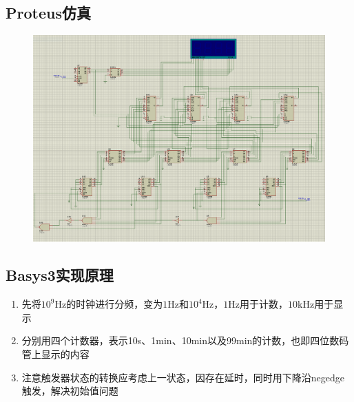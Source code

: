 \documentclass[11pt,UTF8]{ctexart}
\begin{document}
\subsection{Proteus仿真}
\begin{figure}[H]
    \centering
    \includegraphics[width=\linewidth]{fig/Counter_1.PNG}
\end{figure}

\subsection{Basys3实现原理}
\begin{enumerate}
    \item 先将$10^9$Hz的时钟进行分频，变为$1$Hz和$10^4$Hz，$1$Hz用于计数，$10$kHz用于显示
    \item 分别用四个计数器，表示10s、1min、10min以及99min的计数，也即四位数码管上显示的内容
    \item 注意触发器状态的转换应考虑上一状态，因存在延时，同时用下降沿negedge触发，解决初始值问题
\end{enumerate}
\end{document}

